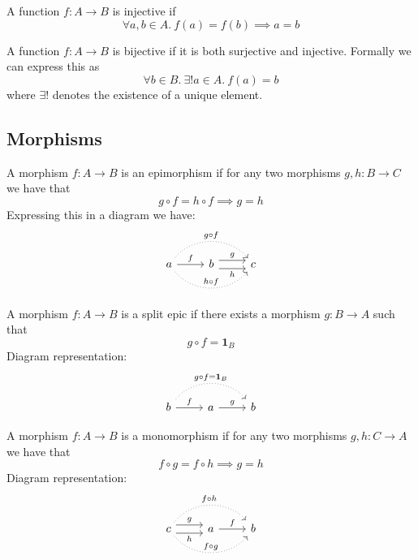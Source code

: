 \documentclass[10pt]{article}
\begin{document}
\begin{definition}[Injective]
  A function $f : A \rightarrow B$ is injective if
  \[
    \forall a, b \in A.\ f(a) = f(b) \implies a = b
  \]
\end{definition}

\begin{definition}[Bijective]
  A function $f : A \rightarrow B$ is bijective if it is both surjective and injective. Formally we can express this as
  \[
    \forall b \in B.\ \exists! a \in A.\ f(a) = b
  \]
  where $\exists!$ denotes the existence of a unique element.
\end{definition}

\subsection{Morphisms}

\begin{definition}
  A morphism $f : A \rightarrow B$ is an epimorphism if for any two morphisms $g, h : B \rightarrow C$ we have that
  \[
    g \circ f = h \circ f \implies g = h
  \]
  Expressing this in a diagram we have:
  \[
    \begin{tikzcd}
      a \arrow[r, "f"] \arrow[rr, bend right=50, dotted, "h \circ f"] \arrow[rr, bend left=50, dotted, "g \circ f"] & b \arrow[r, shift left=1.5, "g"] \arrow[r, shift right=1.5, "h"'] & c
    \end{tikzcd}
  \]
\end{definition}

\begin{definition}
  A morphism $f : A \rightarrow B$ is a split epic if there exists a morphism $g : B \rightarrow A$ such that
  \[
    g \circ f = \textbf{1}_B
  \]
  Diagram representation:
  \[
    \begin{tikzcd}
      b \arrow[rr, bend left=50, dotted, "g \circ f = \mathbf 1_B"] \arrow[r, "f"] & a \arrow[r, "g"] & b
    \end{tikzcd}
  \]
\end{definition}

\begin{definition}[Monomorphism]
  A morphism $f : A \rightarrow B$ is a monomorphism if for any two morphisms $g, h : C \rightarrow A$ we have that
  \[
    f \circ g = f \circ h \implies g = h
  \]
  Diagram representation:
  \[
    \begin{tikzcd}
      c \arrow[r, shift left=1.5, "g"] \arrow[r, shift right=1.5, "h"'] \arrow[rr, bend right=50, dotted, "f \circ g"] \arrow[rr, bend left=50, dotted, "f \circ h"] & a \arrow[r, "f"] & b
    \end{tikzcd}
  \]
\end{definition}
\end{document}
